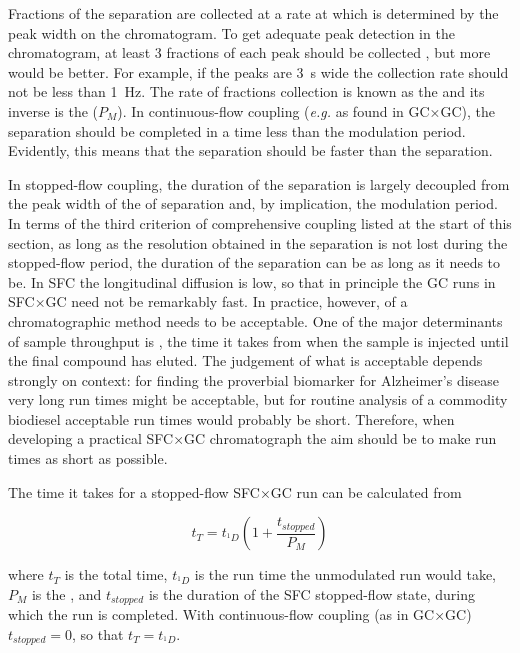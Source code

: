Fractions of the \oneD separation are collected at a rate at which is determined
by the peak width on the \oneD chromatogram. To get adequate peak detection in
the \oneD chromatogram, at least \num{3} fractions of each \oneD peak should be
collected \autocite{Murphy1998}, but more would be better. For example, if the peaks
are \SI{3}{s} wide the collection rate should not be less than \SI{1}{\hertz}.
The rate of fractions collection is known as the  and
its inverse is the  (\(P_M\)). In continuous-flow
coupling (\textit{e.g.} as found in GC×GC), the \twoD separation should be
completed in a time less than the modulation period. Evidently, this means that
the \twoD separation should be faster than the \oneD separation.

In stopped-flow coupling, the duration of the \twoD separation is largely
decoupled from the peak width of the of \oneD separation and, by implication,
the \oneD modulation period. In terms of the third criterion of comprehensive
coupling listed at the start of this section, as long as the resolution obtained
in the \oneD separation is not lost during the stopped-flow period, the duration
of the \twoD separation can be as long as it needs to be. In SFC the
longitudinal diffusion is low, so that in principle the \twoD GC runs in SFC×GC
need not be remarkably fast. In practice, however, 
of a chromatographic method needs to be acceptable. One of the major
determinants of sample throughput is , the time it takes from
when the sample is injected until the final compound has eluted. The judgement
of what is acceptable depends strongly on context: for finding the proverbial
biomarker for Alzheimer's disease very long run times might be acceptable, but
for routine analysis of a commodity biodiesel acceptable run times would
probably be short.
Therefore, when developing a practical SFC×GC chromatograph the aim should be to
make run times as short as possible.

The time it takes for a stopped-flow SFC×GC run can be calculated from

\[t_{T} = t_{^{1}D} ( 1 + \frac{t_{stopped}}{P_{M}} ) \]

where \(t_T\) is the total time, \(t_{^{1}D}\) is the run time the unmodulated
\oneD run would take, \(P_M\) is the , and
\(t_{stopped}\) is the duration of the SFC stopped-flow state, during which the
\twoD run is completed. With continuous-flow coupling (as in GC×GC) \(
t_{stopped}=0 \), so that \(t_{T} = t_{^{1}D}\).

